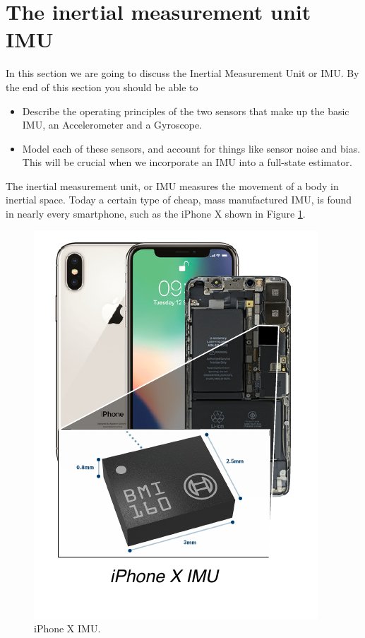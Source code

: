 \section{The inertial measurement unit IMU}
\label{inertial_measurement_unit}

In this section we are going to discuss the Inertial Measurement Unit or IMU. By the end of this section you should be able
to 

\begin{itemize}
\item Describe the operating principles of the two sensors that make up the basic
IMU, an Accelerometer and a Gyroscope. 
\item Model each of these sensors, and account for things like sensor noise and bias. This will be crucial when we incorporate
an IMU into a full-state estimator. 
\end{itemize}



The inertial measurement unit, or IMU measures the movement of
a body in inertial space. Today a certain type of cheap,
mass manufactured IMU, is found in nearly every smartphone,
such as the iPhone X shown in Figure \ref{iphone_x}. 


\begin{figure}[!htb]
\begin{center}
\includegraphics[scale=0.280]{img/hardware/iphone_x.jpeg}
\end{center}
\caption{iPhone X IMU.}
\label{iphone_x}
\end{figure}


